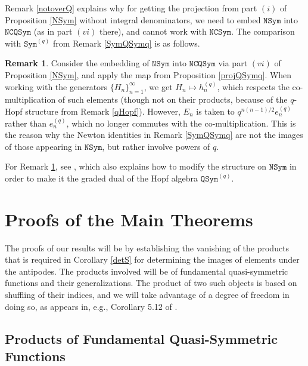 \documentclass{article}
\theoremstyle{definition}
\newtheorem{rmk}[thm]{Remark}
\begin{document}
Remark \ref{notoverQ} explains why for getting the projection from part $(i)$ of Proposition \ref{NSym} without integral denominators, we need to embed $\mathtt{NSym}$ into $\mathtt{NCQSym}$ (as in part $(vi)$ there), and cannot work with $\mathtt{NCSym}$. The comparison with $\mathtt{Sym}^{(q)}$ from Remark \ref{SymQSymq} is as follows.
\begin{rmk}
Consider the embedding of $\mathtt{NSym}$ into $\mathtt{NCQSym}$ via part $(vi)$ of Proposition \ref{NSym}, and apply the map from Proposition \ref{projQSymq}. When working with the generators $\{H_{n}\}_{n=1}^{\infty}$, we get $H_{n} \mapsto h_{n}^{(q)}$, which respects the co-multiplication of such elements (though not on their products, because of the $q$-Hopf structure from Remark \ref{qHopf}). However, $E_{n}$ is taken to $q^{n(n-1)/2}e_{n}^{(q)}$ rather than $e_{n}^{(q)}$, which no longer commutes with the co-multiplication. This is the reason why the Newton identities in Remark \ref{SymQSymq} are not the images of those appearing in $\mathtt{NSym}$, but rather involve powers of $q$. \label{NSymq}
\end{rmk}
For Remark \ref{NSymq}, see \cite{[L]}, which also explains how to modify the structure on $\mathtt{NSym}$ in order to make it the graded dual of the Hopf algebra $\mathtt{QSym}^{(q)}$.

\section{Proofs of the Main Theorems \label{Proofs}}

The proofs of our results will be by establishing the vanishing of the products that is required in Corollary \ref{detS} for determining the images of elements under the antipodes. The products involved will be of fundamental quasi-symmetric functions and their generalizations. The product of two such objects is based on shuffling of their indices, and we will take advantage of a degree of freedom in doing so, as appears in, e.g., Corollary 5.12 of \cite{[AsS]}.

\subsection{Products of Fundamental Quasi-Symmetric Functions}
\end{document}
